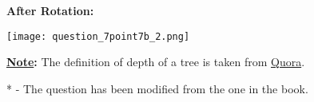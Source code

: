 \documentclass[addpoints]{exam}
\begin{document}
\begin{questions}
\begin{parts}
\begin{solution}
	\textbf{After Rotation:}\\
	\begin{center}
		\texttt{[image: question\_7point7b\_2.png]}\\
	\end{center}
	\textbf{\underline{Note}:} The definition of depth of a tree is taken from \href{https://www.quora.com/What-is-the-difference-between-height-and-depth-of-a-tree}{Quora}.
  \end{solution}
\end{parts}
\pagebreak

\end{questions}

* - The question has been modified from the one in the book.
\end{document}
